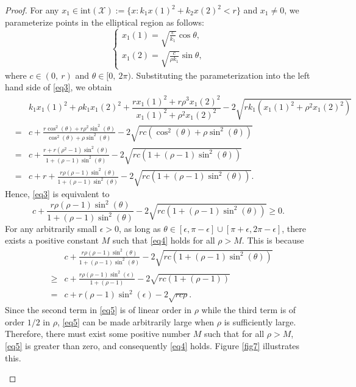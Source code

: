 \documentclass[10pt,a4paper]{amsart}
\begin{document}
\begin{proof}
	For any  $x_1 \in \text{int}(\mathcal{X}) := \{ x : k_1 x(1)^2 + k_2 x(2)^2 < r \}$ and $x_1 \neq 0$, we parameterize points in the elliptical region as follows:
	\begin{equation*}
		\begin{cases}
			x_1(1) = \sqrt{\frac{c}{k_1}} \cos \theta, \\
			x_1(2) = \sqrt{\frac{c}{\rho k_1}} \sin \theta,
		\end{cases}
	\end{equation*}
	where $c \in (0, ~r)$ and $\theta \in [0, ~2\pi)$. Substituting the parameterization into the left hand side of \eqref{eq3}, we obtain
	\begin{eqnarray}
		&&k_1 x_1(1)^2 + \rho k_1 x_1(2)^2 + \dfrac{r x_1(1)^2 + r \rho^3 x_1(2)^2}{x_1(1)^2 + \rho^2 x_1(2)^2} - 2 \sqrt{ r k_1 \left( x_1(1)^2 + \rho^2 x_1(2)^2 \right) } \nonumber\\
		&=& c + \frac{r\cos^2(\theta) + r\rho^2\sin^2(\theta)}{\cos^2(\theta)+\rho\sin^2(\theta)} - 2\sqrt{rc\left(\cos^2(\theta)+\rho\sin^2(\theta)\right)} \nonumber\\
		&=& c + \frac{r + r(\rho^2-1)\sin^2(\theta)}{1+(\rho-1)\sin^2(\theta)} - 2\sqrt{rc\left(1+(\rho-1)\sin^2(\theta)\right)} \nonumber\\
		&=& c + r + \frac{r\rho(\rho-1)\sin^2(\theta)}{1+(\rho-1)\sin^2(\theta)} - 2\sqrt{rc\left(1+(\rho-1)\sin^2(\theta)\right)}. \nonumber
	\end{eqnarray}
	Hence, \eqref{eq3} is equivalent to
	\begin{equation}\label{eq4}
		c + \frac{r\rho(\rho-1)\sin^2(\theta)}{1+(\rho-1)\sin^2(\theta)} - 2\sqrt{rc\left(1+(\rho-1)\sin^2(\theta)\right)} \ge 0.
	\end{equation}
	For any arbitrarily small $\epsilon > 0$, as long as $\theta \in [\epsilon, \pi-\epsilon] \cup [\pi + \epsilon, 2\pi-\epsilon]$, there exists a positive constant $M$ such that \eqref{eq4} holds for all $\rho > M$. This is because
	\begin{eqnarray}
		&&c + \frac{r\rho(\rho-1)\sin^2(\theta)}{1+(\rho-1)\sin^2(\theta)} - 2\sqrt{rc\left(1+(\rho-1)\sin^2(\theta)\right)} \nonumber\\
		&\geq& c + \frac{r\rho(\rho-1)\sin^2(\epsilon)}{1+(\rho-1)} - 2\sqrt{rc\left(1+(\rho-1)\right)} \nonumber\\
		&=& c + r(\rho-1)\sin^2(\epsilon) - 2\sqrt{rc\rho}. \label{eq5}
	\end{eqnarray}
	Since the second term in \eqref{eq5} is of linear order in $\rho$ while the third term is of order $1/2$ in $\rho$, \eqref{eq5} can be made arbitrarily large when $\rho$ is sufficiently large. Therefore, there must exist some positive number $M$ such that for all $\rho > M$, \eqref{eq5} is greater than zero, and consequently \eqref{eq4} holds. Figure \ref{fig7} illustrates this.
	\begin{figure}[h]
		\centering
		

\end{figure}
\end{proof}
\end{document}
